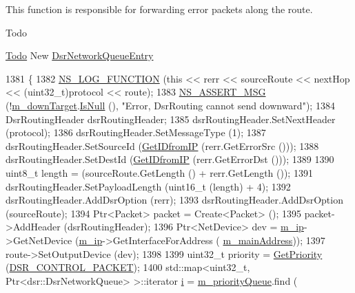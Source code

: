 This function is responsible for forwarding error packets along the route. 

\begin{DoxyRefDesc}{Todo}
\item[\hyperlink{todo__todo000024}{Todo}]New \hyperlink{classns3_1_1dsr_1_1DsrNetworkQueueEntry}{Dsr\+Network\+Queue\+Entry} \end{DoxyRefDesc}

\begin{DoxyCode}
1381 \{
1382   \hyperlink{log-macros-disabled_8h_a90b90d5bad1f39cb1b64923ea94c0761}{NS\_LOG\_FUNCTION} (\textcolor{keyword}{this} << rerr << sourceRoute << nextHop << (uint32\_t)protocol << route);
1383   \hyperlink{assert_8h_aff5ece9066c74e681e74999856f08539}{NS\_ASSERT\_MSG} (!\hyperlink{classns3_1_1dsr_1_1DsrRouting_aa1eb6ea60fdf9ba2cac2079a74ce1ca4}{m\_downTarget}.\hyperlink{classns3_1_1Callback_aa8e27826badbf37f84763f36f70d9b54}{IsNull} (), \textcolor{stringliteral}{"Error, DsrRouting cannot send
       downward"});
1384   DsrRoutingHeader dsrRoutingHeader;
1385   dsrRoutingHeader.SetNextHeader (protocol);
1386   dsrRoutingHeader.SetMessageType (1);
1387   dsrRoutingHeader.SetSourceId (\hyperlink{classns3_1_1dsr_1_1DsrRouting_a4593e50d5f36e9b9b013fe0422067c44}{GetIDfromIP} (rerr.GetErrorSrc ()));
1388   dsrRoutingHeader.SetDestId (\hyperlink{classns3_1_1dsr_1_1DsrRouting_a4593e50d5f36e9b9b013fe0422067c44}{GetIDfromIP} (rerr.GetErrorDst ()));
1389 
1390   uint8\_t length = (sourceRoute.GetLength () + rerr.GetLength ());
1391   dsrRoutingHeader.SetPayloadLength (uint16\_t (length) + 4);
1392   dsrRoutingHeader.AddDsrOption (rerr);
1393   dsrRoutingHeader.AddDsrOption (sourceRoute);
1394   Ptr<Packet> packet = Create<Packet> ();
1395   packet->AddHeader (dsrRoutingHeader);
1396   Ptr<NetDevice> dev = \hyperlink{classns3_1_1dsr_1_1DsrRouting_a0443d48172143cafa1d0491e35f3fbaf}{m\_ip}->GetNetDevice (\hyperlink{classns3_1_1dsr_1_1DsrRouting_a0443d48172143cafa1d0491e35f3fbaf}{m\_ip}->GetInterfaceForAddress (
      \hyperlink{classns3_1_1dsr_1_1DsrRouting_a73182b5edee2d8460f28855e058fc9a0}{m\_mainAddress}));
1397   route->SetOutputDevice (dev);
1398 
1399   uint32\_t priority = \hyperlink{classns3_1_1dsr_1_1DsrRouting_a67d111b0188b6e2210d1b4782820f8e3}{GetPriority} (\hyperlink{namespacens3_1_1dsr_a7c80bcec67d78dc149a0e503014d07c5abeaa53bf31d961c221e4e377ef6022f2}{DSR\_CONTROL\_PACKET});
1400   std::map<uint32\_t, Ptr<dsr::DsrNetworkQueue> >::iterator \hyperlink{bernuolliDistribution_8m_a6f6ccfcf58b31cb6412107d9d5281426}{i} = \hyperlink{classns3_1_1dsr_1_1DsrRouting_a4606c3dfb1099afbfe1e7cd1d1c3c8ee}{m\_priorityQueue}.find (

\end{DoxyCode}

